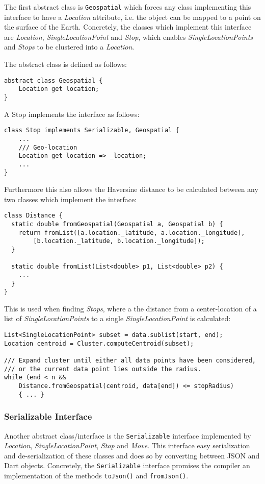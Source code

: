 The first abstract class is \verb|Geospatial| which forces any class implementing this interface to have a \textit{Location} attribute, i.e. the object can be mapped to a point on the surface of the Earth. Concretely, the classes which implement this interface are \textit{Location}, \textit{SingleLocationPoint} and \textit{Stop}, which enables \textit{SingleLocationPoints} and \textit{Stops} to be clustered into a \textit{Location}.

The abstract class is defined as follows:
\begin{verbatim}
abstract class Geospatial {
    Location get location;
}
\end{verbatim}

A Stop implements the interface as follows:
\begin{verbatim}
class Stop implements Serializable, Geospatial { 
    ...
    /// Geo-location
    Location get location => _location;
    ...
}
\end{verbatim}

Furthermore this also allows the Haversine distance to be calculated between any two classes which implement the interface:

\begin{verbatim}
class Distance {
  static double fromGeospatial(Geospatial a, Geospatial b) {
    return fromList([a.location._latitude, a.location._longitude],
        [b.location._latitude, b.location._longitude]);
  }

  static double fromList(List<double> p1, List<double> p2) {
    ...
  }
}
\end{verbatim}

This is used when finding \textit{Stops}, where a the distance from a center-location of a list of \textit{SingleLocationPoints} to a single \textit{SingleLocationPoint} is calculated:

\begin{verbatim}
List<SingleLocationPoint> subset = data.sublist(start, end);
Location centroid = Cluster.computeCentroid(subset);

/// Expand cluster until either all data points have been considered,
/// or the current data point lies outside the radius.
while (end < n && 
    Distance.fromGeospatial(centroid, data[end]) <= stopRadius) 
    { ... }
\end{verbatim}

\subsubsection{Serializable Interface}
Another abstract class/interface is the \verb|Serializable| interface implemented by \textit{Location}, \textit{SingleLocationPoint}, \textit{Stop} and \textit{Move}. This interface easy serialization and de-serialization of these classes and does so by converting between JSON and Dart objects. Concretely, the \verb|Serializable| interface promises the compiler an implementation of the methods \verb|toJson()| and \verb|fromJson()|.

